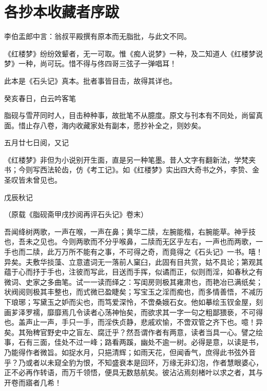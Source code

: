 

\chapter{各抄本收藏者序跋}%

{}

李伯盂郎中言：翁叔平殿撰有原本而无脂批，与此文不同。

《红楼梦》纷纷效颦者，无一可取。惟《痴人说梦》一种，及二知道人《红楼梦说梦》一种，尚可玩。惜不得与佟四哥三弦子一弹唱耳！

此本是《石头记》真本。批者事皆目击，故得其详也。

\begin{flushright}
	癸亥春日，白云吟客笔　　
\end{flushright}

脂砚与雪芹同时人，目击种种事，故批笔不从臆度。原文与刊本有不同处，尚留真面。惜止存八卷，海内收藏家处有副本，愿抄补全之，则妙矣。

\begin{flushright}
	五月廿七日阅，又记　　
\end{flushright}

《红楼梦》非但为小说别开生面，直是另一种笔墨。昔人文字有翻新法，学梵夹书；今则写西法轮齿，仿《考工记》。如《红楼梦》实出四大奇书之外，李贽、金圣叹皆未曾见也。

\begin{flushright}
	戊辰秋记　　

{（原载《脂砚斋甲戌抄阅再评石头记》卷末）}　　

\end{flushright}
{}

吾闻绛树两歌，一声在喉，一声在鼻；黄华二牍，左腕能楷，右腕能草。神乎技也，吾未之见也。今则两歌而不分乎喉鼻，二牍而无区乎左右，一声也而两歌，一手也而二牍，此万万所不能有之事，不可得之奇，而竟得之《石头记》一书。嘻！异矣。夫敷华掞藻、立意遣词无一落前人窠臼，此固有目共赏，姑不具论；第观其蕴于心而抒于手也，注彼而写此，目送而手挥，似谲而正，似则而淫，如春秋之有微词、史家之多曲笔。试一一读而绎之：写闺房则极其雍肃也，而艳冶已满纸矣；状阀阅则极其丰整也，而式微已盈睫矣；写宝玉之淫而痴也，而多情善悟，不减历下琅琊；写黛玉之妒而尖也，而笃爱深怜，不啻桑娥石女。他如摹绘玉钗金屋，刻画芗泽罗襦，靡靡焉几令读者心荡神怡矣，而欲求其一字一句之粗鄙猥亵，不可得也。盖声止一声，手只一手，而淫佚贞静，悲戚欢愉，不啻双管之齐下也。噫！异矣。其殆稗官野史中之盲左、腐迁乎？然吾谓作者有两意，读者当具一心。譬之绘事，石有三面，佳处不过一峰；路看两蹊，幽处不逾一树。必得是意，以读是书，乃能得作者微旨。如捉水月，只挹清辉；如雨天花，但闻香气，庶得此书弦外音乎？乃或者以未窥全豹为恨，不知盛衰本是回环，万缘无非幻泡，作者慧眼婆心，正不必再作转语，而万千领悟，便具无数慈航矣。彼沾沾焉刻楮叶以求之者，其与开卷而寤者几希！

